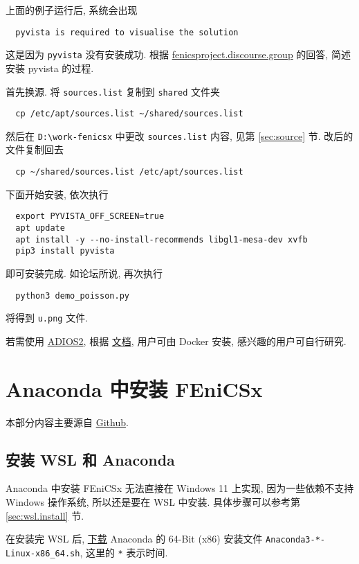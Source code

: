 \documentclass[fontset=founder]{ctexrep}
\begin{document}
上面的例子运行后,
系统会出现
\begin{lstlisting}
  pyvista is required to visualise the solution
\end{lstlisting}
这是因为 \texttt{pyvista} 没有安装成功.
根据 \href{https://fenicsproject.discourse.group/t/how-to-use-pyvista-in-docker-for-windows-10-user/6921}{fenicsproject.discourse.group} 的回答,
简述安装 pyvista 的过程.

首先换源.
将 \texttt{sources.list} 复制到 \texttt{shared} 文件夹
\begin{lstlisting}
  cp /etc/apt/sources.list ~/shared/sources.list
\end{lstlisting}
然后在 \texttt{D:\textbackslash work-fenicsx} 中更改 \texttt{sources.list} 内容,
见第 \ref{sec:source} 节.
改后的文件复制回去
\begin{lstlisting}
  cp ~/shared/sources.list /etc/apt/sources.list
\end{lstlisting}

下面开始安装,
依次执行
\begin{lstlisting}
  export PYVISTA_OFF_SCREEN=true
  apt update
  apt install -y --no-install-recommends libgl1-mesa-dev xvfb
  pip3 install pyvista
\end{lstlisting}
即可安装完成.
如论坛所说,
再次执行
\begin{lstlisting}
  python3 demo_poisson.py
\end{lstlisting}
将得到 \texttt{u.png} 文件.

若需使用
\href{https://github.com/ornladios/ADIOS2}{ADIOS2},
根据%
\href{https://adios2.readthedocs.io/en/latest/setting_up/setting_up.html#docker}{文档},
用户可由 Docker 安装,
感兴趣的用户可自行研究.

\chapter{Anaconda 中安装 FEniCSx}

本部分内容主要源自
\href{https://github.com/FEniCS/dolfinx#conda}{Github}.

\section{安装 WSL 和 Anaconda}

Anaconda 中安装 FEniCSx 无法直接在 Windows 11 上实现,
因为一些依赖不支持 Windows 操作系统,
所以还是要在 WSL 中安装.
具体步骤可以参考第 \ref{sec:wsl.install} 节.

在安装完 WSL 后,
\href{https://www.anaconda.com/products/distribution#Downloads}{下载}
Anaconda 的 64-Bit (x86) 安装文件 \texttt{Anaconda3-*-Linux-x86\_64.sh},
这里的 \texttt{*} 表示时间.
\end{document}
